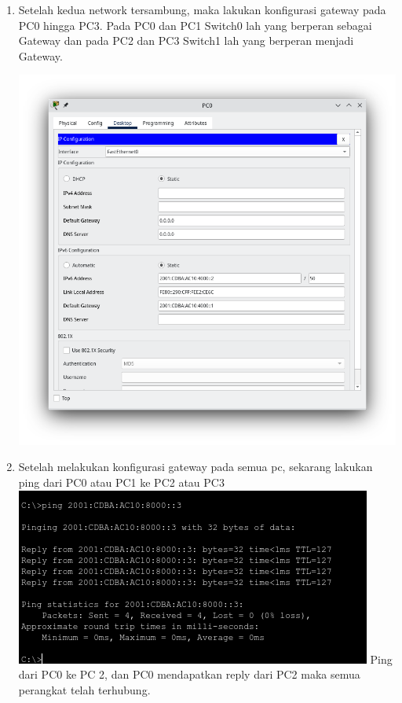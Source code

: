 \documentclass{article}
\begin{document}
\begin{flushleft}
\begin{enumerate}
            \item Setelah kedua network tersambung, maka lakukan konfigurasi gateway pada PC0 hingga PC3. Pada PC0 dan PC1 Switch0 lah yang berperan sebagai Gateway dan pada PC2 dan PC3 Switch1 lah yang berperan menjadi Gateway.
            
            \includegraphics[scale=0.4]{3-9.png}

            \item Setelah melakukan konfigurasi gateway pada semua pc, sekarang lakukan ping dari PC0 atau PC1 ke PC2 atau PC3
            \includegraphics[scale=0.9]{3-10.png}
            Ping dari PC0 ke PC 2, dan PC0 mendapatkan reply dari PC2 maka semua perangkat telah terhubung.
            
        \end{enumerate}
    \end{flushleft}
\end{document}
